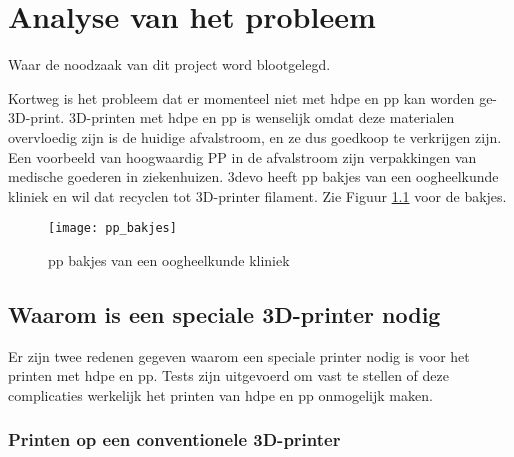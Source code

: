 \chapter{Analyse van het probleem}
\label{Analyse_van_het_probleem}

\begin{center}
    \begin{minipage}{0.5\textwidth}
        \begin{small}
            Waar de noodzaak van dit project word blootgelegd.
        \end{small} 
    \end{minipage}
    \vspace{0.5cm}
\end{center}

Kortweg is het probleem dat er momenteel niet met \ac{hdpe} en \ac{pp} kan
worden ge-3D-print. 3D-printen met \ac{hdpe} en \ac{pp} is wenselijk omdat deze
materialen overvloedig zijn is de huidige afvalstroom, en ze dus goedkoop
te verkrijgen zijn.\\

Een voorbeeld van hoogwaardig PP in de afvalstroom zijn verpakkingen van
medische goederen in ziekenhuizen.  3devo heeft \ac{pp} bakjes van een
oogheelkunde kliniek en wil dat recyclen tot 3D-printer filament. Zie Figuur
\ref{fig:pp_bakjes} voor de bakjes.

\begin{figure}[h]
    \centerline{\texttt{[image: pp\_bakjes]}}
    \caption{\ac{pp} bakjes van een oogheelkunde kliniek}
    \label{fig:pp_bakjes}
\end{figure}

\section{Waarom is een speciale 3D-printer nodig}

Er zijn twee redenen gegeven waarom een speciale printer nodig is voor het
printen met \ac{hdpe} en \ac{pp}.  Tests zijn uitgevoerd om vast te stellen of
deze complicaties werkelijk het printen van \ac{hdpe} en \ac{pp} onmogelijk
maken.

\subsection{Printen op een conventionele 3D-printer}

